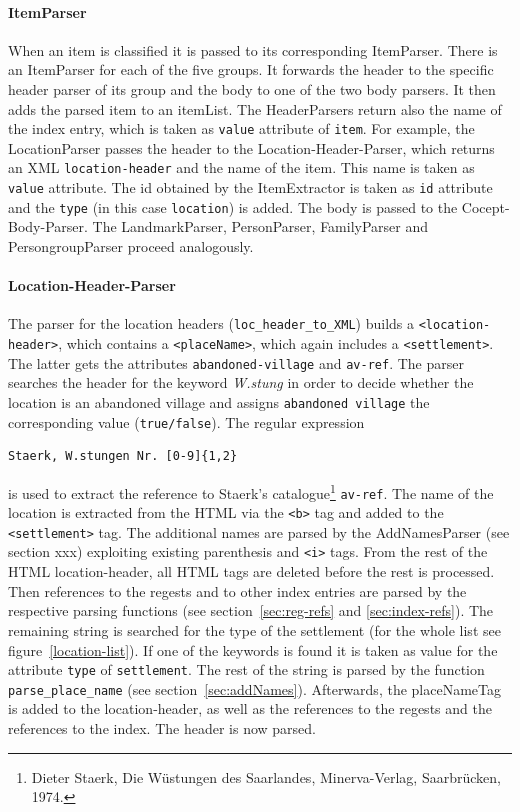 \paragraph{ItemParser}
When an item is classified it is passed to its corresponding ItemParser. There is an ItemParser for each of the five groups. It forwards the header to the specific header parser of its group and the body to one of the two body parsers. It then adds the parsed item to an itemList. The HeaderParsers return also the name of the index entry, which is taken as \texttt{value} attribute of \texttt{item}. For example, the LocationParser passes the header to the Location-Header-Parser, which returns an XML \texttt{location-header} and the name of the item. This name is taken as \texttt{value} attribute. The id obtained by the ItemExtractor is taken as \texttt{id} attribute and the \texttt{type} (in this case \texttt{location}) is added. The body is passed to the Cocept-Body-Parser. The LandmarkParser, PersonParser, FamilyParser and PersongroupParser proceed analogously. 

\paragraph{Location-Header-Parser}
The parser for the location headers (\texttt{loc\_header\_to\_XML}) builds a \texttt{<location-header>}, which contains a \texttt{<placeName>}, which again includes a \texttt{<settlement>}. The latter gets the attributes \texttt{abandoned-village} and \texttt{av-ref}. The parser searches the header for the keyword \textit{W.stung} in order to decide whether the location is an abandoned village and assigns \texttt{abandoned village} the corresponding value (\texttt{true/false}). The regular expression 

\begin{verbatim}
Staerk, W.stungen Nr. [0-9]{1,2} 
\end{verbatim}

is used to extract the reference to Staerk's catalogue\footnote{Dieter Staerk, Die Wüstungen des Saarlandes, Minerva-Verlag, Saarbrücken, 1974.} \texttt{av-ref}. The name of the location is extracted from the HTML via the \texttt{<b>} tag and added to the \texttt{<settlement>} tag. The additional names are parsed by the AddNamesParser (see section xxx) exploiting existing parenthesis and \texttt{<i>} tags. From the rest of the HTML location-header, all HTML tags are deleted before the rest is processed. Then references to the regests and to other index entries are parsed by the respective parsing functions (see section~\ref{sec:reg-refs} and \ref{sec:index-refs}). The remaining string is searched for the type of the settlement (for the whole list see figure~\ref{location-list}). If one of the keywords is found it is taken as value for the attribute \texttt{type} of \texttt{settlement}. The rest of the string is parsed by the function \texttt{parse\_place\_name} (see section~\ref{sec:addNames}). Afterwards, the placeNameTag is added to the location-header, as well as the references to the regests and the references to the index. The header is now parsed.

